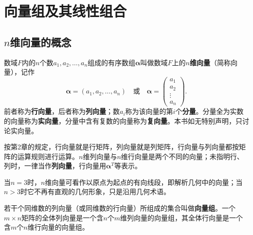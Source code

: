 
\section{向量组及其线性组合}

\subsection{$n$维向量的概念}
\begin{definition}[$n$维向量]
数域$F$内的$n$个数$a_1,a_2,\dots,a_n$组成的有序数组$\boldsymbol{\alpha}$叫做数域$F$上的\textbf{$n$维向量}（简称向量），记作
\[
\boldsymbol{\alpha}=(a_1,a_2,\dots,a_n)
\quad\text{或}\quad
\boldsymbol{\alpha}=
\begin{pmatrix}
a_1\\ a_2\\ \vdots\\ a_n
\end{pmatrix}.
\]
前者称为\textbf{行向量}，后者称为\textbf{列向量}；数$a_i$称为该向量的第$i$个\textbf{分量}。分量全为实数的向量称为\textbf{实向量}，分量中含有复数的向量称为\textbf{复向量}。本书如无特别声明，只讨论实向量。
\end{definition}

按第2章的规定，行向量就是行矩阵，列向量就是列矩阵，行向量与列向量都按矩阵的运算规则进行运算。$n$维列向量与$n$维行向量是两个不同的向量；未指明行、列时，一律当作\textbf{列向量}，行向量用$\boldsymbol{\alpha}^{T}$等表示。

当$n=3$时，$n$维向量可看作以原点为起点的有向线段，即解析几何中的向量；当$n>3$时它不再有直观的几何形象，只是沿用几何术语。
\begin{definition}[向量组]
若干个同维数的列向量（或同维数的行向量）所组成的集合叫做\textbf{向量组}。一个$m\times n$矩阵的全体列向量是一个含$n$个$m$维列向量的向量组，其全体行向量是一个含$m$个$n$维行向量的向量组。
\end{definition}

